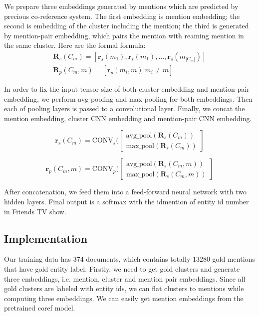 \documentclass[11pt]{article}
\begin{document}
We prepare three embeddings generated by mentions which are predicted by precious co-reference system. The first embedding is mention embedding; the second is embedding of the cluster including the mention; the third is generated by mention-pair embedding, which pairs the mention with reaming mention in the same cluster. Here are the formal formula:
\begin{eqnarray}
\mathbf{R}_s(C_m) = [\mathbf{r}_s(m_1),\mathbf{r}_s(m_1),...,\mathbf{r}_s(m_{|C_m|})]\\
\mathbf{R}_p(C_m,m) = [\mathbf{r}_p(m_i,m)|m_i \neq m]
\end{eqnarray}



In order to fix the input tensor size of both cluster embedding and mention-pair embedding, we perform avg-pooling and max-pooling for both embeddings. Then each of pooling layers is passed to a convolutional layer. Finally, we concat the mention embedding, cluster CNN embedding and mention-pair CNN embedding.

\begin{equation}
\mathbf{r}_s(C_m) = \textrm{CONV}_s(\begin{bmatrix}
\text{avg\_pool}(\mathbf{R}_s(C_m))\\
\text{max\_pool}(\mathbf{R}_s(C_m))
\end{bmatrix}
\end{equation}


\begin{equation}
\mathbf{r}_p(C_m,m) = \textrm{CONV}_p(\begin{bmatrix}
\text{avg\_pool}(\mathbf{R}_s(C_m,m))\\
\text{max\_pool}(\mathbf{R}_s(C_m,m))
\end{bmatrix}
\end{equation}


After concatenation, we feed them into a feed-forward neural network with two hidden layers. Final output is a softmax with the idmention of entity id number in Friends TV show.

\subsection{Implementation}
Our training data has 374 documents, which contains totally 13280 gold mentions that have gold entity label. Firstly, we need to get gold clusters and generate three embeddings, i.e. mention, cluster and mention pair embeddings. Since all gold clusters are labeled with entity ids, we can flat clusters to mentions while computing three embeddings. We can easily get mention embeddings from the pretrained coref model.
\end{document}
